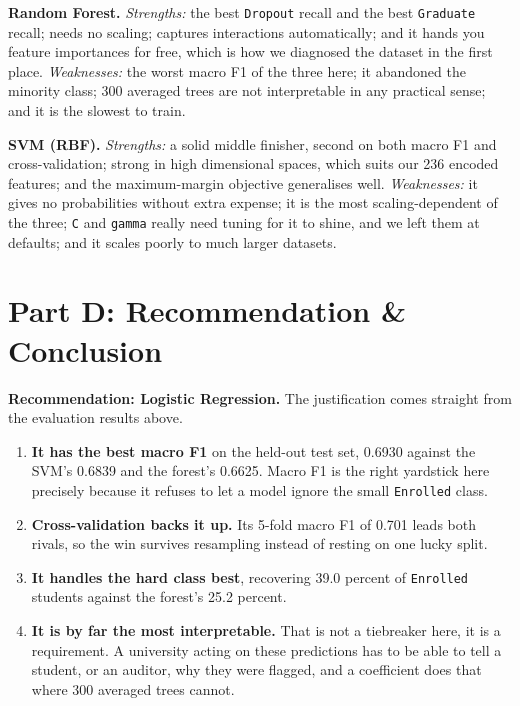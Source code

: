 \documentclass[11pt,a4paper]{article}
\begin{document}
\textbf{Random Forest.} \emph{Strengths:} the best \texttt{Dropout} recall and the best
\texttt{Graduate} recall; needs no scaling; captures interactions automatically; and it
hands you feature importances for free, which is how we diagnosed the dataset in the
first place. \emph{Weaknesses:} the worst macro F1 of the three here; it abandoned the
minority class; 300 averaged trees are not interpretable in any practical sense; and it
is the slowest to train.

\textbf{SVM (RBF).} \emph{Strengths:} a solid middle finisher, second on both macro F1
and cross-validation; strong in high dimensional spaces, which suits our 236 encoded
features; and the maximum-margin objective generalises well. \emph{Weaknesses:} it gives
no probabilities without extra expense; it is the most scaling-dependent of the three;
\texttt{C} and \texttt{gamma} really need tuning for it to shine, and we left them at
defaults; and it scales poorly to much larger datasets.

\section*{Part D: Recommendation \& Conclusion}

\textbf{Recommendation: Logistic Regression.} The justification comes straight from the
evaluation results above.

\begin{enumerate}
    \item \textbf{It has the best macro F1} on the held-out test set, 0.6930 against the
    SVM's 0.6839 and the forest's 0.6625. Macro F1 is the right yardstick here precisely
    because it refuses to let a model ignore the small \texttt{Enrolled} class.
    \item \textbf{Cross-validation backs it up.} Its 5-fold macro F1 of 0.701 leads both
    rivals, so the win survives resampling instead of resting on one lucky split.
    \item \textbf{It handles the hard class best}, recovering 39.0 percent of
    \texttt{Enrolled} students against the forest's 25.2 percent.
    \item \textbf{It is by far the most interpretable.} That is not a tiebreaker here,
    it is a requirement. A university acting on these predictions has to be able to tell
    a student, or an auditor, why they were flagged, and a coefficient does that where
    300 averaged trees cannot.
\end{enumerate}
\end{document}
